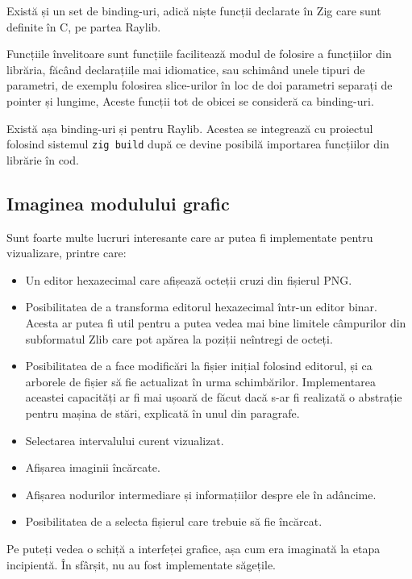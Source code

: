 \documentclass[a4paper,12pt]{report}
\begin{document}
Există și un set de binding-uri, adică niște funcții declarate în Zig care sunt definite în C, pe partea Raylib.

Funcțiile învelitoare sunt funcțiile facilitează modul de folosire a funcțiilor din librăria,
făcând declarațiile mai idiomatice, sau schimând unele tipuri de parametri,
de exemplu folosirea slice-urilor în loc de doi parametri separați de pointer și lungime,
Aceste funcții tot de obicei se consideră ca binding-uri.

Există așa binding-uri și pentru Raylib\cite{raylib_zig}.
Acestea se integrează cu proiectul folosind sistemul \texttt{zig build}
după ce devine posibilă importarea funcțiilor din librărie în cod.

\subsection{Imaginea modulului grafic}

Sunt foarte multe lucruri interesante care ar putea fi implementate pentru vizualizare, printre care:
\begin{itemize}
    \item
        Un editor hexazecimal care afișează octeții cruzi din fișierul \ac{PNG}. 
    \item
        Posibilitatea de a transforma editorul hexazecimal într-un editor binar.
        Acesta ar putea fi util pentru a putea vedea mai bine limitele câmpurilor din
        subformatul Zlib care pot apărea la poziții neîntregi de octeți.
    \item
        Posibilitatea de a face modificări la fișier inițial folosind editorul,
        și ca arborele de fișier să fie actualizat în urma schimbărilor.
        Implementarea aceastei capacități ar fi mai ușoară de făcut dacă s-ar fi realizată
        o abstrație pentru mașina de stări, explicată în unul din paragrafe.
    \item
        Selectarea intervalului curent vizualizat.
    \item
        Afișarea imaginii încărcate.
    \item
        Afișarea nodurilor intermediare și informațiilor despre ele în adâncime.
    \item
        Posibilitatea de a selecta fișierul care trebuie să fie încărcat.
\end{itemize}

Pe  puteți vedea o schiță a interfeței grafice,
așa cum era imaginată la etapa incipientă.
În sfârșit, nu au fost implementate săgețile.
\end{document}
